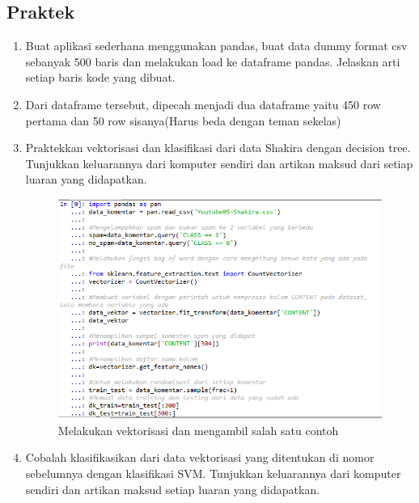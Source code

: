 \subsection{Praktek}
\begin{enumerate}
    \item Buat aplikasi sederhana menggunakan pandas, buat data dummy format csv sebanyak 500 baris dan melakukan load ke dataframe pandas. Jelaskan arti setiap baris kode yang dibuat.
    
    \item Dari dataframe tersebut, dipecah menjadi dua dataframe yaitu 450 row pertama dan 50 row sisanya(Harus beda dengan teman sekelas)
    
    \item Praktekkan vektorisasi dan klasifikasi dari data Shakira dengan decision tree. Tunjukkan keluarannya dari komputer sendiri dan artikan maksud dari setiap luaran yang didapatkan.
    
    \begin{figure}[ht]
        \centering
        \includegraphics[scale=0.2]{figures/1174051/4/6.PNG}
        \caption{Melakukan vektorisasi dan mengambil salah satu contoh}
        \label{contoh6}
    \end{figure}
    \item Cobalah klasifikasikan dari data vektorisasi yang ditentukan di nomor sebelumnya dengan klasifikasi SVM. Tunjukkan keluarannya dari komputer sendiri dan artikan maksud setiap luaran yang didapatkan.
    
    \begin{figure}[ht]

\end{figure}
\end{enumerate}
